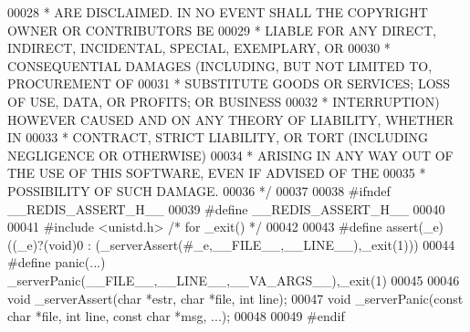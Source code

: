 \begin{DoxyCode}
00028 \textcolor{comment}{ * ARE DISCLAIMED. IN NO EVENT SHALL THE COPYRIGHT OWNER OR CONTRIBUTORS BE}
00029 \textcolor{comment}{ * LIABLE FOR ANY DIRECT, INDIRECT, INCIDENTAL, SPECIAL, EXEMPLARY, OR}
00030 \textcolor{comment}{ * CONSEQUENTIAL DAMAGES (INCLUDING, BUT NOT LIMITED TO, PROCUREMENT OF}
00031 \textcolor{comment}{ * SUBSTITUTE GOODS OR SERVICES; LOSS OF USE, DATA, OR PROFITS; OR BUSINESS}
00032 \textcolor{comment}{ * INTERRUPTION) HOWEVER CAUSED AND ON ANY THEORY OF LIABILITY, WHETHER IN}
00033 \textcolor{comment}{ * CONTRACT, STRICT LIABILITY, OR TORT (INCLUDING NEGLIGENCE OR OTHERWISE)}
00034 \textcolor{comment}{ * ARISING IN ANY WAY OUT OF THE USE OF THIS SOFTWARE, EVEN IF ADVISED OF THE}
00035 \textcolor{comment}{ * POSSIBILITY OF SUCH DAMAGE.}
00036 \textcolor{comment}{ */}
00037 
00038 \textcolor{preprocessor}{#}\textcolor{preprocessor}{ifndef} \textcolor{preprocessor}{\_\_REDIS\_ASSERT\_H\_\_}
00039 \textcolor{preprocessor}{#}\textcolor{preprocessor}{define} \textcolor{preprocessor}{\_\_REDIS\_ASSERT\_H\_\_}
00040 
00041 \textcolor{preprocessor}{#}\textcolor{preprocessor}{include} \textcolor{preprocessor}{<}\textcolor{preprocessor}{unistd}\textcolor{preprocessor}{.}\textcolor{preprocessor}{h}\textcolor{preprocessor}{>} \textcolor{comment}{/* for \_exit() */}
00042 
00043 \textcolor{preprocessor}{#}\textcolor{preprocessor}{define} \textcolor{preprocessor}{assert}\textcolor{preprocessor}{(}\textcolor{preprocessor}{\_e}\textcolor{preprocessor}{)} \textcolor{preprocessor}{(}\textcolor{preprocessor}{(}\textcolor{preprocessor}{\_e}\textcolor{preprocessor}{)}\textcolor{preprocessor}{?}\textcolor{preprocessor}{(}\textcolor{keywordtype}{void}\textcolor{preprocessor}{)}0 \textcolor{preprocessor}{:} \textcolor{preprocessor}{(}\textcolor{preprocessor}{\_serverAssert}\textcolor{preprocessor}{(}\textcolor{preprocessor}{#}\textcolor{preprocessor}{\_e}\textcolor{preprocessor}{,}\textcolor{preprocessor}{\_\_FILE\_\_}\textcolor{preprocessor}{,}\textcolor{preprocessor}{\_\_LINE\_\_}\textcolor{preprocessor}{)}\textcolor{preprocessor}{,}\textcolor{preprocessor}{\_exit}\textcolor{preprocessor}{(}1\textcolor{preprocessor}{)}\textcolor{preprocessor}{)}\textcolor{preprocessor}{)}
00044 \textcolor{preprocessor}{#}\textcolor{preprocessor}{define} \textcolor{preprocessor}{panic}\textcolor{preprocessor}{(}\textcolor{preprocessor}{...}\textcolor{preprocessor}{)} \textcolor{preprocessor}{\_serverPanic}\textcolor{preprocessor}{(}\textcolor{preprocessor}{\_\_FILE\_\_}\textcolor{preprocessor}{,}\textcolor{preprocessor}{\_\_LINE\_\_}\textcolor{preprocessor}{,}\textcolor{preprocessor}{\_\_VA\_ARGS\_\_}\textcolor{preprocessor}{)}\textcolor{preprocessor}{,}\textcolor{preprocessor}{\_exit}\textcolor{preprocessor}{(}1\textcolor{preprocessor}{)}
00045 
00046 \textcolor{keywordtype}{void} \_serverAssert(\textcolor{keywordtype}{char} *estr, \textcolor{keywordtype}{char} *file, \textcolor{keywordtype}{int} line);
00047 \textcolor{keywordtype}{void} \_serverPanic(\textcolor{keyword}{const} \textcolor{keywordtype}{char} *file, \textcolor{keywordtype}{int} line, \textcolor{keyword}{const} \textcolor{keywordtype}{char} *msg, ...);
00048 
00049 \textcolor{preprocessor}{#}\textcolor{preprocessor}{endif}
\end{DoxyCode}
